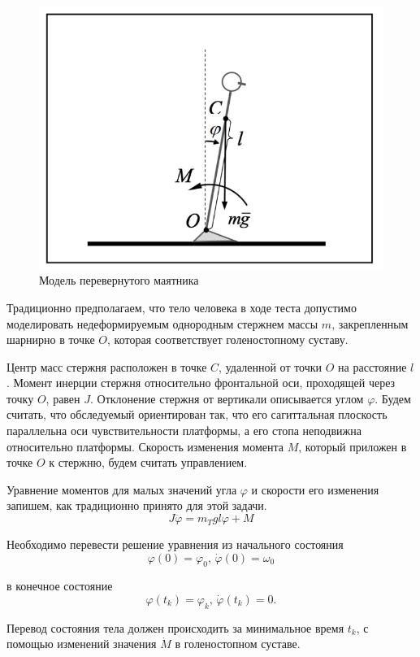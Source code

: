 \documentclass[a4paper,14pt]{article}
\theoremstyle{plain} %
\theoremstyle{definition} %
\theoremstyle{remark} %
\begin{document}
{\begin{figure}[h!]
    \centering
    \includegraphics[width=0.9\linewidth]{pendulum.png}
    \caption{Модель перевернутого маятника}
    \label{fig:pendulum}
\end{figure}

Традиционно предполагаем, что тело человека в ходе теста допустимо
моделировать недеформируемым однородным стержнем массы $m$,
закрепленным шарнирно в точке $O$, которая соответствует
голеностопному суставу.

Центр масс стержня расположен в точке $C$, удаленной от точки $O$
на расстояние $l$. Момент инерции стержня относительно фронтальной
оси, проходящей через точку $O$, равен $J$. Отклонение стержня от
вертикали описывается углом $\varphi$. Будем считать, что обследуемый
ориентирован так, что его сагиттальная плоскость параллельна оси
чувствительности платформы, а его стопа неподвижна относительно
платформы. Скорость изменения момента $M$, который приложен в точке $O$ к стержню,
будем считать управлением.

Уравнение моментов для малых значений угла $\varphi$ и
скорости его изменения запишем, как традиционно принято для этой задачи.
\[
    J\ddot{\varphi}= m_Tgl\varphi+M
\]

Необходимо перевести решение уравнения из начального состояния
\[
    \varphi(0)=\varphi_0, \,\dot{\varphi}(0)=\omega_0
\]

в конечное состояние
\[
    \varphi(t_k)=\varphi_k,\, \dot{\varphi}(t_k)=0.
\]

Перевод состояния тела должен происходить за минимальное
время $t_k$, с помощью изменений значения $\dot{M}$ в
голеностопном суставе.

}
\end{document}
